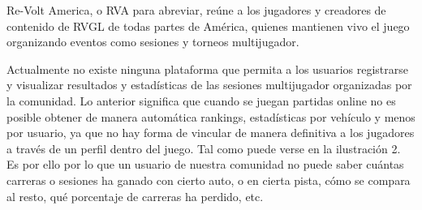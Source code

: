 Re-Volt America, o RVA para abreviar, reúne a los jugadores y creadores de contenido de RVGL de todas partes de América, quienes mantienen vivo el juego organizando eventos como sesiones y torneos multijugador.

Actualmente no existe ninguna plataforma que permita a los usuarios registrarse y visualizar resultados y estadísticas de las sesiones multijugador organizadas por la comunidad. Lo anterior significa que cuando se juegan partidas online no es posible obtener de manera automática rankings, estadísticas por vehículo y menos por usuario, ya que no hay forma de vincular de manera definitiva a los jugadores a través de un perfil dentro del juego. Tal como puede verse en la ilustración 2. Es por ello por lo que un usuario de nuestra comunidad no puede saber cuántas carreras o sesiones ha ganado con cierto auto, o en cierta pista, cómo se compara al resto, qué porcentaje de carreras ha perdido, etc.



